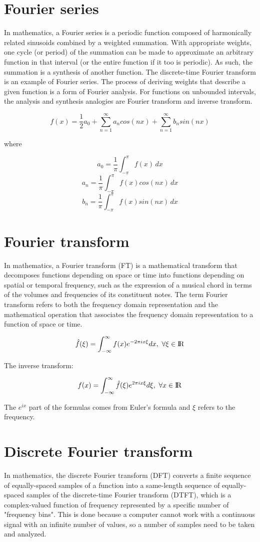 \documentclass[journal,compsoc]{IEEEtran}
\begin{document}
\section{Fourier series}
In mathematics, a Fourier series is a periodic function composed of harmonically related sinusoids combined by a weighted summation. With appropriate weights, one cycle (or period) of the summation can be made to approximate an arbitrary function in that interval (or the entire function if it too is periodic). As such, the summation is a synthesis of another function. The discrete-time Fourier transform is an example of Fourier series. The process of deriving weights that describe a given function is a form of Fourier analysis. For functions on unbounded intervals, the analysis and synthesis analogies are Fourier transform and inverse transform.

\[f(x) = \frac{1}{2}a_0 + \sum_{n=1}^{\infty}a_ncos(nx) + \sum_{n=1}^{\infty}b_nsin(nx)\]

where

\[a_0 = \frac{1}{\pi}\int_{-\pi}^{\pi} f(x) \,dx\]
\[a_n = \frac{1}{\pi}\int_{-\pi}^{\pi} f(x)cos(nx) \,dx\]
\[b_n = \frac{1}{\pi}\int_{-\pi}^{\pi} f(x)sin(nx) \,dx\]

\section{Fourier transform}
In mathematics, a Fourier transform (FT) is a mathematical transform that decomposes functions depending on space or time into functions depending on spatial or temporal frequency, such as the expression of a musical chord in terms of the volumes and frequencies of its constituent notes. The term Fourier transform refers to both the frequency domain representation and the mathematical operation that associates the frequency domain representation to a function of space or time.

\[\hat{f}(\xi) = \int_{-\infty}^{\infty}f(x)e^{-2\pi ix\xi}dx,\ \forall \xi \in \rm I\!R \]

The inverse transform: 

\[f(x) = \int_{-\infty}^{\infty}\hat{f}(\xi)e^{2\pi ix\xi}d\xi,\ \forall x \in \rm I\!R \]

The $e^{ix}$ part of the formulas comes from Euler's formula and $\xi$ refers to the frequency.

\section{Discrete Fourier transform}
In mathematics, the discrete Fourier transform (DFT) converts a finite sequence of equally-spaced samples of a function into a same-length sequence of equally-spaced samples of the discrete-time Fourier transform (DTFT), which is a complex-valued function of frequency represented by a specific number of "frequency bins". This is done because a computer cannot work with a continuous signal with an infinite number of values, so a number of samples need to be taken and analyzed.
\end{document}
